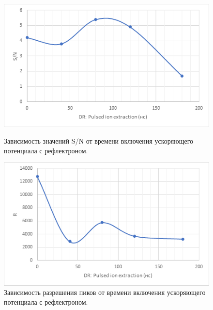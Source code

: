 \documentclass[12pt]{article}
\begin{document}
\begin{flushleft}
\begin{figure}[!h]
\begin{center}
\begin{minipage}[h]{0.4\linewidth}
\includegraphics[width=1.2\linewidth]{5}
\caption{Зависимость значений S/N от времени включения ускоряющего потенциала с рефлектроном.} %
\label{ris:experimoriginal} %
\end{minipage}
\hfill 
\begin{minipage}[h]{0.4\linewidth}
\includegraphics[width=1.2\linewidth]{6}
\caption{Зависимость разрешения пиков от времени включения ускоряющего потенциала с рефлектроном.}
\label{ris:experimcoded}
\end{minipage}
\end{center}
\end{figure}


\end{flushleft}
\end{document}
